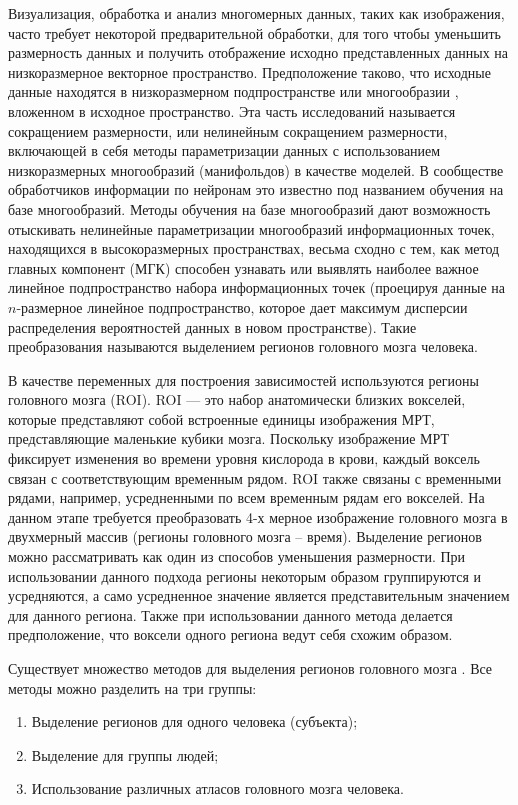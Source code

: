 Визуализация, обработка и анализ многомерных данных, таких как изображения, часто требует некоторой предварительной обработки, для того чтобы уменьшить размерность данных и получить отображение исходно представленных данных на низкоразмерное векторное пространство. Предположение таково, что исходные данные находятся в низкоразмерном подпространстве или многообразии \cite{brun2006manifold}, вложенном в исходное пространство. Эта часть исследований называется сокращением размерности, или нелинейным сокращением размерности, включающей в себя методы параметризации данных с использованием низкоразмерных многообразий (манифольдов) в качестве моделей. В сообществе обработчиков информации по нейронам это известно под названием обучения на базе многообразий. Методы обучения на базе многообразий дают возможность отыскивать нелинейные параметризации многообразий информационных точек, находящихся в высокоразмерных пространствах, весьма сходно с тем, как метод главных компонент (МГК) способен узнавать или выявлять наиболее важное линейное подпространство набора информационных точек (проецируя данные на $n$-размерное линейное подпространство, которое дает максимум дисперсии распределения вероятностей данных в новом пространстве). Такие преобразования называются выделением регионов головного мозга человека.

В качестве переменных для построения зависимостей используются регионы головного мозга (ROI). ROI — это набор анатомически близких вокселей, которые представляют собой встроенные единицы изображения МРТ, представляющие маленькие кубики мозга. Поскольку изображение МРТ фиксирует изменения во времени уровня кислорода в крови, каждый воксель связан с соответствующим временным рядом. ROI также связаны с временными рядами, например, усредненными по всем временным рядам его вокселей. На данном этапе требуется преобразовать 4-х мерное изображение головного мозга в двухмерный массив (регионы головного мозга – время). Выделение регионов можно рассматривать как один из способов уменьшения размерности. При использовании данного подхода регионы некоторым образом группируются и усредняются, а само усредненное значение является представительным значением для данного региона. Также при использовании данного метода делается предположение, что воксели одного региона ведут себя схожим образом. 

Существует множество методов для выделения регионов головного мозга \cite{Arslan2018}. Все методы можно разделить на три группы:
\begin{enumerate}
    \item Выделение регионов для одного человека (субъекта);
    \item Выделение для группы людей;
    \item Использование различных атласов головного мозга человека.
\end{enumerate}

